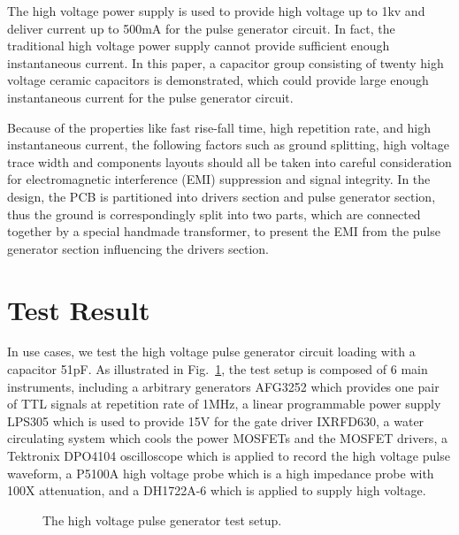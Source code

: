 \documentclass[aip,rsi,reprint,graphicx]{revtex4-1} %
\begin{document}
	The high voltage power supply is used to provide high voltage up to 1kv and deliver current up to 500mA for the pulse generator circuit. 
In fact, the traditional high voltage power supply cannot provide sufficient enough instantaneous current. 
In this paper, a capacitor group consisting of twenty high voltage ceramic capacitors is demonstrated, which could provide large enough instantaneous current for the pulse generator circuit.

Because of the properties like fast rise-fall time, high repetition rate, and high instantaneous current, the following factors  such as ground splitting, high voltage trace width and components layouts should all be taken into careful consideration for electromagnetic interference (EMI) suppression and signal integrity.
In the design, the PCB is partitioned into drivers section and pulse generator section, thus the ground is correspondingly split into two parts, which are connected together by a special handmade transformer, to present the EMI from the pulse generator section influencing the drivers section.

\section{Test Result}
In use cases, we test the high voltage pulse generator circuit loading with a capacitor 51pF.  As illustrated in Fig.~\ref{FIG3}, the test setup is composed of 6 main instruments, including a arbitrary generators AFG3252 which provides one pair of  TTL signals at repetition rate of 1MHz, a  linear programmable power supply LPS305 which is used to provide 15V for the gate driver IXRFD630, a water circulating system which cools the power MOSFETs and the MOSFET drivers,  
a Tektronix DPO4104 oscilloscope which is applied to record the high voltage pulse waveform, a P5100A high voltage probe which is a high impedance probe with 100X attenuation, and a DH1722A-6 which is applied to supply high voltage.

\begin{figure}
\caption{The high voltage pulse generator test setup. \label{FIG3}}%
\end{figure}
\end{document}
